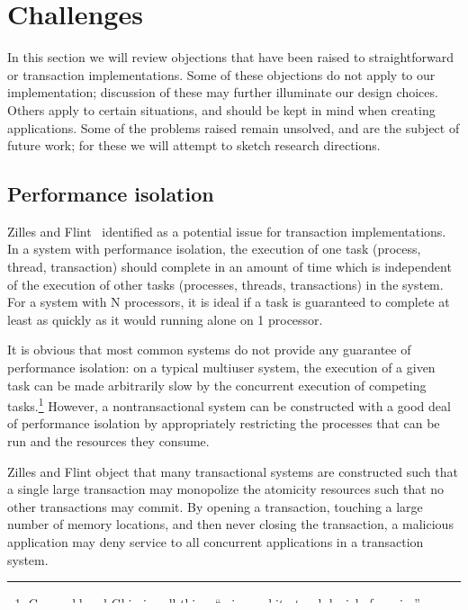 \chapter{Challenges}\label{cha:chall}

In this section we will review objections that have been raised to
straightforward or \naive transaction implementations.
Some of these objections do not apply to our implementation;
discussion of these may further illuminate our design choices.
Others apply to certain situations, and should be kept in mind when
creating applications.  Some of the problems raised remain unsolved,
and are the subject of future work; for these we will attempt to sketch
research directions.

\section{Performance isolation}
Zilles and Flint~\cite{ZillesFl05} identified
 as a potential issue for
transaction implementations.  In a system with performance isolation,
the execution of one task (process, thread, transaction) should
complete in an amount of time which is independent of the execution of
other tasks (processes, threads, transactions) in the system.  For
a system with N processors, it is ideal if a task is guaranteed to
complete at least as quickly as it would running alone on 1
processor.

It is obvious that most common systems do not provide any guarantee of
performance isolation: on a typical multiuser system, the execution
of a given task can be made arbitrarily slow by the concurrent
execution of competing tasks.\footnote{Grunwald and
  Ghiasi~\cite{GrunwaldGh02} call this a ``microarchitectural denial
  of service'' attack.}
However, a nontransactional system can
be constructed with a good deal of performance isolation by
appropriately restricting the processes that can be run and the
resources they consume.

Zilles and Flint object that many transactional systems are
constructed such that a single large transaction may monopolize the
atomicity resources such that no other transactions may commit.  By
opening a transaction, touching a large number of memory locations,
and then never closing the transaction, a malicious application may
deny service to all concurrent applications in a transaction system.

